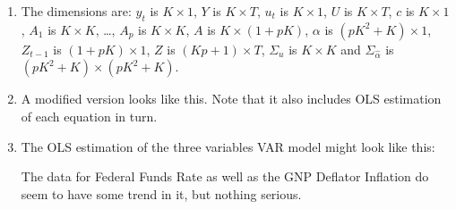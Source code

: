 \begin{enumerate}
\item The dimensions are: \(y_t\) is \(K \times 1\), \(Y\) is \(K \times T\), \(u_t\) is \(K \times 1\),
\(U\) is \(K \times T\), \(c\) is \(K \times 1\), \(A_1\) is \(K \times K\), \ldots, \(A_p\) is \(K \times K\),
\(A\) is \(K \times (1+pK)\), \(\alpha\) is \((pK^2+K) \times 1\),
\(Z_{t-1}\) is \((1+pK) \times 1\), \(Z\) is \((Kp+1) \times T\),
\(\Sigma_u\) is \(K \times K\) and \(\Sigma_{\hat{\alpha}}\) is \((pK^2+K) \times (pK^2+K)\).


\item A modified version looks like this.
Note that it also includes OLS estimation of each equation in turn.
	

\item The OLS estimation of the three variables VAR model might look like this:

The data for Federal Funds Rate as well as the GNP Deflator Inflation do seem to have some trend in it, but nothing serious.
\end{enumerate}

